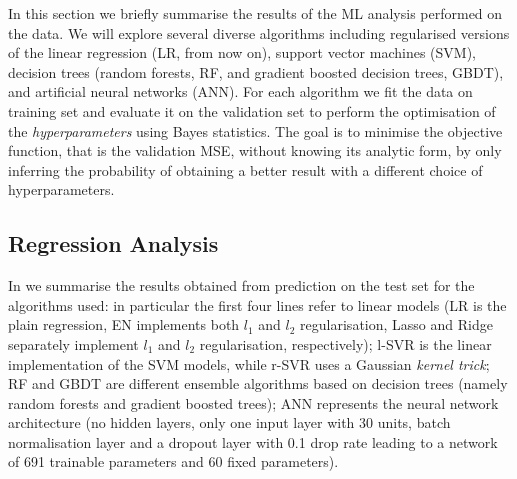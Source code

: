 In this section we briefly summarise the results of the ML analysis performed
on the data.
We will explore several diverse algorithms including regularised versions of
the linear regression (LR, from now on), support vector machines (SVM),
decision trees (random forests, RF, and gradient boosted decision trees, GBDT),
and artificial neural networks (ANN).
For each algorithm we fit the data on training set and evaluate it on the
validation set to perform the optimisation of the \textit{hyperparameters}
using Bayes statistics.
The goal is to minimise the objective function, that is the validation MSE,
without knowing its analytic form, by only inferring the probability of
obtaining a better result with a different choice of hyperparameters.

\subsection{Regression Analysis}\label{sec:ml:regr}

In  we summarise the results obtained from prediction on the
test set for the algorithms used: in particular the first four lines refer to
linear models (LR is the plain regression, EN implements both $l_1$ and $l_2$
regularisation, Lasso and Ridge separately implement $l_1$ and $l_2$
regularisation, respectively); l-SVR is the linear implementation of the SVM
models, while r-SVR uses a Gaussian \textit{kernel trick}; RF and GBDT are
different ensemble algorithms based on decision trees (namely random forests
and gradient boosted trees); ANN represents the neural network architecture (no
hidden layers, only one input layer with 30 units, batch normalisation layer
and a dropout layer with 0.1 drop rate leading to a network of 691 trainable parameters and 60 fixed parameters).

